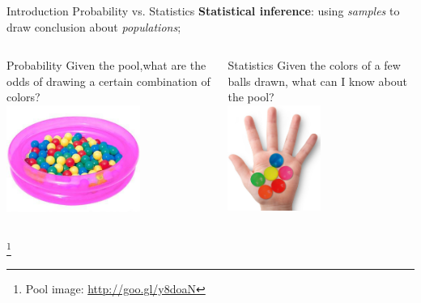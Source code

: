 \documentclass[t]{beamer}
\begin{document}

\begin{ftst}
{Introduction}
{Probability vs. Statistics}
\textbf{Statistical inference}: using \textit{samples} to draw conclusion about \textit{populations};

\begin{columns}[T]
	\begin{block}{Probability}
		\centering Given the pool,what are the odds of drawing a certain combination of colors?\\
		\centering \includegraphics[height=3.5cm]{../figs/ballpool.png}
	\end{block}
	\begin{block}{Statistics}
		\centering Given the colors of a few balls drawn, what can I know about the pool?\\
		\centering \includegraphics[height=3.45cm]{../figs/hand02.png}
	\end{block}
\end{columns}
\let\thefootnote\relax\footnote{\tiny Pool image: \url{http://goo.gl/y8doaN}}
\end{ftst}

\end{document}
